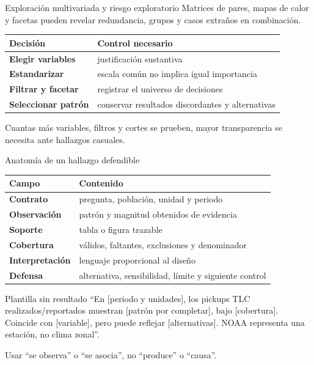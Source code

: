 \documentclass[aspectratio=169,11pt]{beamer}
\begin{document}
\begin{frame}{Exploración multivariada y riesgo exploratorio}
  \small
  Matrices de pares, mapas de calor y facetas pueden revelar redundancia, grupos y casos extraños en combinación.
  \vspace{.4em}
  \begin{tabularx}{\textwidth}{>{\bfseries}p{} X}
    \toprule
    Decisión & Control necesario \\
    \midrule
    Elegir variables & justificación sustantiva \\
    Estandarizar & escala común no implica igual importancia \\
    Filtrar y facetar & registrar el universo de decisiones \\
    Seleccionar patrón & conservar resultados discordantes y alternativas \\
    \bottomrule
  \end{tabularx}
  \vspace{.5em}
  \centering
  \par Cuantas más variables, filtros y cortes se prueben, mayor transparencia se necesita ante hallazgos casuales.
\end{frame}

\begin{frame}{Anatomía de un hallazgo defendible}
  \footnotesize
  \begin{tabularx}{\textwidth}{>{\bfseries}p{} X}
    \toprule
    Campo & Contenido \\
    \midrule
    Contrato & pregunta, población, unidad y periodo \\
    Observación & patrón y magnitud obtenidos de evidencia \\
    Soporte & tabla o figura trazable \\
    Cobertura & válidos, faltantes, exclusiones y denominador \\
    Interpretación & lenguaje proporcional al diseño \\
    Defensa & alternativa, sensibilidad, límite y siguiente control \\
    \bottomrule
  \end{tabularx}
  \vspace{.5em}
  \begin{block}{Plantilla sin resultado}
    ``En [periodo y unidades], los pickups TLC realizados/reportados muestran [patrón por completar], bajo [cobertura]. Coincide con [variable], pero puede reflejar [alternativas]. NOAA representa una estación, no clima zonal''.
  \end{block}
  \centering Usar ``se observa'' o ``se asocia'', no ``produce'' o ``causa''.
\end{frame}
\end{document}
